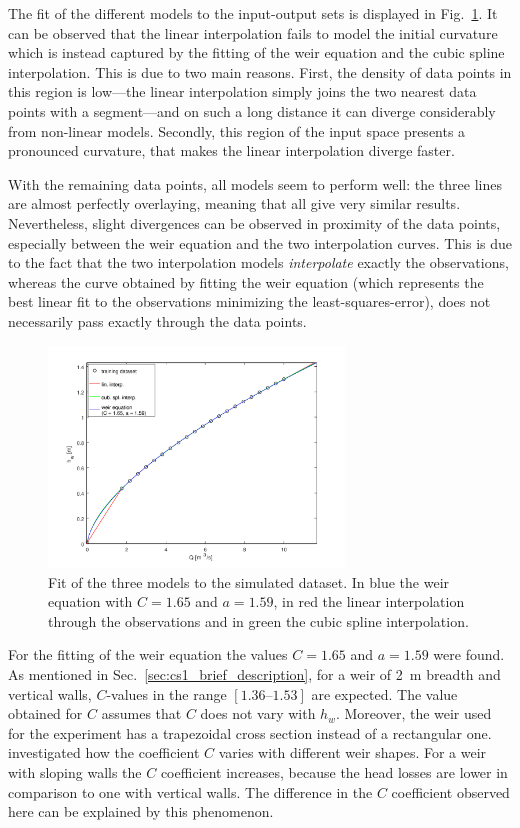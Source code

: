 The fit of the different models to the input-output sets is displayed in Fig.~\ref{fig:fitting_results}.
It can be observed that the linear interpolation fails to model the initial curvature which is instead captured by the fitting of the weir equation and the cubic spline interpolation.
This is due to two main reasons. 
First, the density of data points in this region is low---the linear interpolation simply joins the two nearest data points with a segment---and on such a long distance it can diverge considerably from non-linear models.
Secondly, this region of the input space presents a pronounced curvature, that makes the linear interpolation diverge faster.

With the remaining data points, all models seem to perform well: the three lines are almost perfectly overlaying, meaning that all give very similar results.
Nevertheless, slight divergences can be observed in proximity of the data points, especially between the weir equation and the two interpolation curves. This is due to the fact that the two interpolation models \emph{interpolate} exactly the observations, whereas the curve obtained by fitting the weir equation (which represents the best linear fit to the observations minimizing the least-squares-error), does not necessarily pass exactly through the data points.

\begin{figure}[h]
  \centering
  \includegraphics[width=0.7\textwidth]{Figures/fitting_results.png}
  \caption{Fit of the three models to the simulated dataset. In blue the weir equation with $C = \num{1.65}$ and $a = \num{1.59}$, in red the linear interpolation through the observations and in green the cubic spline interpolation.}
  \label{fig:fitting_results}
\end{figure}

For the fitting of the weir equation the values $C = 1.65$ and $a = 1.59$ were found.
As mentioned in Sec.~\ref{sec:cs1_brief_description}, for a weir of \SI{2}{\m} breadth and vertical walls, $C$-values in the range $[\numrange{1.36}{1.53}]$ are expected.
The value obtained for $C$ assumes that $C$ does not vary with $h_w$.
Moreover, the weir used for the experiment has a trapezoidal cross section instead of a rectangular one.
\cite{tracy_discharge_1957} investigated how the coefficient $C$ varies with different weir shapes.
For a weir with sloping walls the $C$ coefficient increases, because the head losses are lower in comparison to one with vertical walls.
The difference in the $C$ coefficient observed here can be explained by this phenomenon.\\

